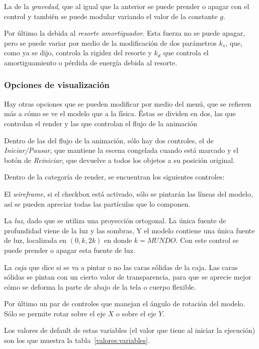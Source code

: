 La de la \emph{gravedad}, que al igual que la anterior se puede prender o apagar con el control y también se puede modular variando el valor de la constante $g$.

Por último la debida al \emph{resorte amortiguador}. Esta fuerza no se puede apagar, pero se puede variar por medio de la modificación de dos parámetros $k_{s}$, que, como ya se dijo, controla la rigidez del resorte y $k_{d}$ que controla el amortiguamiento o pérdida de energía debida al resorte.

\subsubsection{Opciones de visualización}
Hay otras opciones que se pueden modificar por medio del menú, que se refieren más a cómo se ve el modelo que a la física. Éstas se dividen en dos, las que controlan el render y las que controlan el flujo de la animación

Dentro de las del flujo de la animación, sólo hay dos controles, el de \emph{Iniciar/Pausar}, que mantiene la escena congelada cuando está marcado y el botón de \emph{Reiniciar}, que devuelve a todos los objetos a su posición original.

Dentro de la categoría de render, se encuentran los siguientes controles:

El \emph{wireframe}, si el checkbox está activado, sólo se pintarán las líneas del modelo, así se pueden apreciar todas las partículas que lo componen.

La \emph{luz}, dado que se utiliza una proyección ortogonal. La única fuente de profundidad viene de la luz y las sombras, Y el modelo contiene una única fuente de luz, localizada en $(0, k, 2k)$ en donde $k = MUNDO$. Con este control se puede prender o apagar esta fuente de luz.

La \emph{caja} que dice si se va a pintar o no las caras sólidas de la caja. Las caras sólidas se pintan con un cierto valor de transparencia, para que se aprecie mejor cómo se deforma la parte de abajo de la tela o cuerpo flexible.

Por último un par de controles que manejan el ángulo de rotación del modelo. Sólo se permite rotar sobre el eje $X$ o sobre el eje $Y$.

Los valores de default de estas variables (el valor que tiene al iniciar la ejecución) son los que muestra la tabla~\ref{valores:variables}.

